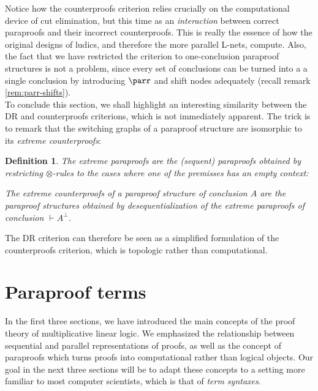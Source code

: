 \documentclass[12pt]{report}
\newcommand{\seq}{\vdash}
\newcommand{\irule}[1]{\vspace*{-10em}\footnotesize$#1$}
\newtheorem{definition}{Definition}
\begin{document}
Notice how the counterproofs criterion relies crucially on the computational device of cut
elimination, but this time as an \emph{interaction} between correct paraproofs and their incorrect
counterproofs. This is really the essence of how the original designs of ludics, and therefore the
more parallel L-nets, compute. Also, the fact that we have restricted the criterion to
one-conclusion paraproof structures is not a problem, since every set of conclusions can be turned
into a a single conclusion by introducing $\parr$ and shift nodes adequately (recall remark
\ref{rem:parr-shifts}). \\

To conclude this section, we shall highlight an interesting similarity between the DR and
counterproofs criterions, which is not immediately apparent. The trick is to remark that the
switching graphs of a paraproof structure are isomorphic to its \emph{extreme counterproofs}:

\begin{definition}
    The \emph{extreme paraproofs} are the (sequent) paraproofs obtained by restricting
    $\otimes$-rules to the cases where one of the premisses has an empty context:
    The \emph{extreme counterproofs} of a paraproof structure of conclusion $A$ are the paraproof
    structures obtained by desequentialization of the extreme paraproofs of conclusion $\seq
    A^\bot$.
\end{definition}

The DR criterion can therefore be seen as a simplified formulation of the counterproofs criterion,
which is topologic rather than computational.

\chapter{Paraproof terms}
\label{sec:paraproof-terms}


In the first three sections, we have introduced the main concepts of the proof theory of
multiplicative linear logic. We emphasized the relationship between sequential and parallel
representations of proofs, as well as the concept of paraproofs which turns proofs into
computational rather than logical objects. Our goal in the next three sections will be to adapt
these concepts to a setting more familiar to most computer scientists, which is that of \emph{term
syntaxes}.
\end{document}
